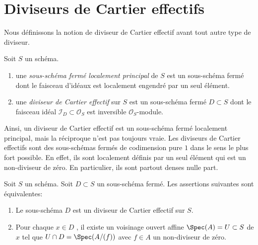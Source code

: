 \section{Diviseurs de Cartier effectifs}
\label{section-effective-Cartier-divisors}

\noindent
Nous définissons la notion de diviseur de Cartier effectif avant tout autre type
de diviseur.

\begin{definition}
\label{definition-effective-Cartier-divisor}
Soit  $S$  un schéma.
\begin{enumerate}
\item une {\it sous-schéma fermé localement principal}  de
 $S$ est un sous-schéma fermé dont le faisceau d'idéaux est localement
engendré par un seul élément.
\item une {\it diviseur de Cartier effectif} sur $S$ 
est un sous-schéma fermé  $D \subset S$ dont le faisceau idéal $\mathcal{I}_D \subset \mathcal{O}_S$  est
inversible  $\mathcal{O}_S$-module.
\end{enumerate}
\end{definition}

\noindent
Ainsi, un diviseur de Cartier effectif est un sous-schéma fermé localement
principal, mais la réciproque n'est pas toujours vraie. Les diviseurs de Cartier
effectifs sont des sous-schémas fermés de codimension pure  $1$  dans le
sens le plus fort possible. En effet, ils sont localement définis par un seul
élément qui est un non-diviseur de zéro. En particulier, ils sont partout denses
nulle part.

\begin{lemma}
\label{lemma-characterize-effective-Cartier-divisor}
Soit  $S$  un schéma. Soit  $D \subset S$  un sous-schéma fermé. Les
assertions suivantes sont équivalentes:
\begin{enumerate}
\item Le sous-schéma  $D$  est un diviseur de Cartier effectif sur  $S$.
\item Pour chaque  $x \in D$ , il existe un voisinage ouvert affine  $\Spec(A) = U \subset S$  de
 $x$  tel que  $U \cap D = \Spec(A/(f))$  avec  $f \in A$  un non-diviseur de zéro.
\end{enumerate}
\end{lemma}

